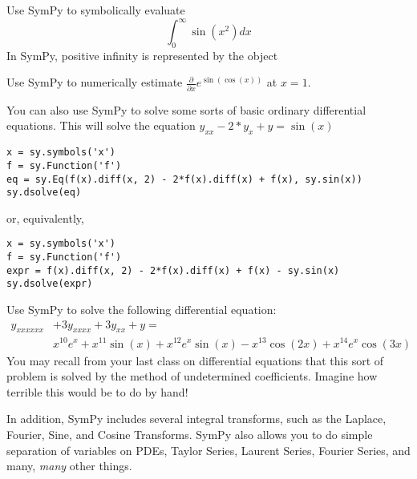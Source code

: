 \begin{problem}
Use SymPy to symbolically evaluate
\begin{equation*}
\int_0^\infty \sin\left(x^2\right) dx
\end{equation*}
In SymPy, positive infinity is represented by the object 
\end{problem}

\begin{problem}
Use SymPy to numerically estimate $\frac{\partial}{\partial x}e^{\sin\left(\cos\left(x\right)\right)}$ at $x=1$.
\end{problem}

You can also use SymPy to solve some sorts of basic ordinary differential equations.
This will solve the equation $y_{xx}-2*y_x+y=\sin\left(x\right)$
\begin{lstlisting}
x = sy.symbols('x')
f = sy.Function('f')
eq = sy.Eq(f(x).diff(x, 2) - 2*f(x).diff(x) + f(x), sy.sin(x))
sy.dsolve(eq)
\end{lstlisting}
or, equivalently,
\begin{lstlisting}
x = sy.symbols('x')
f = sy.Function('f')
expr = f(x).diff(x, 2) - 2*f(x).diff(x) + f(x) - sy.sin(x)
sy.dsolve(expr)
\end{lstlisting}
\begin{problem}
Use SymPy to solve the following differential equation:
\begin{equation*}
\begin{split}
 y_{xxxxxx} & + 3y_{xxxx} + 3y_{xx} + y = \\
& x^{10}e^x + x^{11}\sin\left(x\right) + x^{12}e^x\sin\left(x\right) -x^{13}\cos\left(2x\right) + x^{14}e^x\cos\left(3x\right)
\end{split}
\end{equation*}
You may recall from your last class on differential equations that this sort of problem is solved by the method of undetermined coefficients.
Imagine how terrible this would be to do by hand!
\end{problem}

In addition, SymPy includes several integral transforms, such as the Laplace, Fourier, Sine, and Cosine Transforms.
SymPy also allows you to do simple separation of variables on PDEs, Taylor Series, Laurent Series, Fourier Series, and many, \textit{many} other things.

